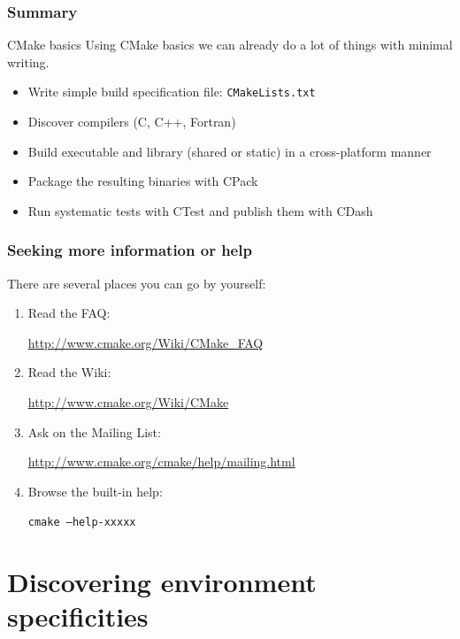 \documentclass[compress,slidestop,table
              ]
               {beamer}
\newcommand{\fname}[1]{\texttt{#1}}
\begin{document}
\begin{frame}[fragile]
\frametitle{Summary}
\begin{block}{CMake basics}
Using CMake basics we can already do a lot of things with minimal writing.
\end{block}
\begin{itemize}
\item Write simple build specification file: \fname{CMakeLists.txt}
\item Discover compilers (C, C++, Fortran)
\item Build executable and library (shared or static) in a cross-platform manner
\item Package the resulting binaries with CPack
\item Run systematic tests with CTest and publish them with CDash
\end{itemize}
\end{frame}

\begin{frame}[fragile]
\frametitle{Seeking more information or help}
There are several places you can go by yourself:
\begin{enumerate}
\item Read the FAQ:

      \url{http://www.cmake.org/Wiki/CMake_FAQ}
\item Read the Wiki:

      \url{http://www.cmake.org/Wiki/CMake}
\item Ask on the Mailing List:

      \url{http://www.cmake.org/cmake/help/mailing.html}

\item Browse the built-in help:

     \fname{cmake --help-xxxxx}
\end{enumerate}
\end{frame}

\section{Discovering environment specificities}
\end{document}
